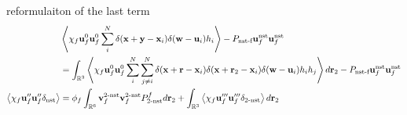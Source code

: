 \documentclass[12pt]{My_preprint}
\begin{document}
reformulaiton of the last term 
\begin{align*}
    &\left<
        \chi_f
        \textbf{u}_f^0
    \textbf{u}_f^0
    \sum_i^N 
    \delta(\textbf{x}+\textbf{y}-\textbf{x}_i)
    \delta(\textbf{w}-\textbf{u}_i)
    h_i
    \right>
    - P_\text{nst-f} 
    \textbf{u}_f^\text{nst}
    \textbf{u}_f^\text{nst}
    \\
    &= 
    \int_{\mathbb{R}^3}
    \left<
    \chi_f
    \textbf{u}_f^0
    \textbf{u}_f^0
    \sum_i^N 
    \sum_{j\neq i}^N 
    \delta(\textbf{x}+\textbf{r}-\textbf{x}_i)
    \delta(\textbf{x}+\textbf{r}_2-\textbf{x}_i)
    \delta(\textbf{w}-\textbf{u}_i)
    h_i
    h_j
    \right>
    d \textbf{r}_2
    - P_\text{nst-f} 
    \textbf{u}_f^\text{nst}
    \textbf{u}_f^\text{nst}\\
    \left<
        \chi_f
        \textbf{u}_f''
        \textbf{u}_f''
        \delta_\text{nst}
    \right>
    &= 
    \phi_f
    \int_{\mathbb{R}^6}
    \textbf{v}_f^\text{2-nst}
    \textbf{v}_f^\text{2-nst}
    P_\text{2-nst}^f
    d\textbf{r}_2
    + 
    \int_{\mathbb{R}^3}
    \left<
        \chi_f
        \textbf{u}_f'''
        \textbf{u}_f'''
        \delta_\text{2-nst}
    \right>
    d\textbf{r}_2
\end{align*}


\appendix
\end{document}
